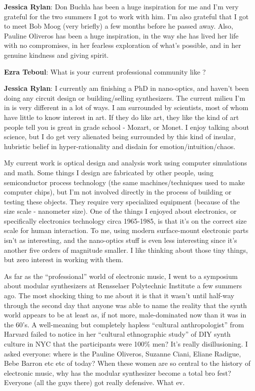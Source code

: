 \textbf{Jessica Rylan}: Don Buchla has been a huge inspiration for me and I'm very grateful for the two summers I got to work with him. I'm also grateful that I got to meet Bob Moog (very briefly) a few months before he passed away. Also, Pauline Oliveros has been a huge inspiration, in the way she has lived her life with no compromises, in her fearless exploration of what's possible, and in her genuine kindness and giving spirit.

\textbf{Ezra Teboul}: What is your current professional community like ? 

                  
\textbf{Jessica Rylan}: I currently am finishing a PhD in nano-optics, and haven't been doing any circuit design or building/selling synthesizers. The current milieu I'm in is very different in a lot of ways. I am surrounded by scientists, most of whom have little to know interest in art. If they do like art, they like the kind of art people tell you is great in grade school - Mozart, or Monet. I enjoy talking about science, but I do get very alienated being surrounded by this kind of insular, hubristic belief in hyper-rationality and disdain for emotion/intuition/chaos. 

My current work is optical design and analysis work using computer simulations and math. Some things I design are fabricated by other people, using semiconductor process technology (the same machines/techniques used to make computer chips), but I'm not involved directly in the process of building or testing these objects. They require very specialized equipment (because of the size scale - nanometer size). One of the things I enjoyed about electronics, or specifically electronics technology circa 1965-1985, is that it's on the correct size scale for human interaction. To me, using modern surface-mount electronic parts isn't as interesting, and the nano-optics stuff is even less interesting since it's another five orders of magnitude smaller. I like thinking about those tiny things, but zero interest in working with them.

As far as the ``professional'' world of electronic music, I went to a symposium about modular synthesizers at Rensselaer Polytechnic Institute a few summers ago. The most shocking thing to me about it is that it wasn't until half-way through the second day that anyone was able to name the reality that the synth world appears to be at least as, if not more, male-dominated now than it was in the 60's. A well-meaning but completely hapless ``cultural anthropologist'' from Harvard failed to notice in her ``cultural ethnographic study'' of DIY synth culture in NYC that the participants were 100\% men? It's really disillusioning. I asked everyone: where is the Pauline Oliveros, Suzanne Ciani, Eliane Radigue, Bebe Barron etc etc of today? When these women are so central to the history of electronic music, why has the modular synthesizer become a total bro fest? Everyone (all the guys there) got really defensive. What ev.

